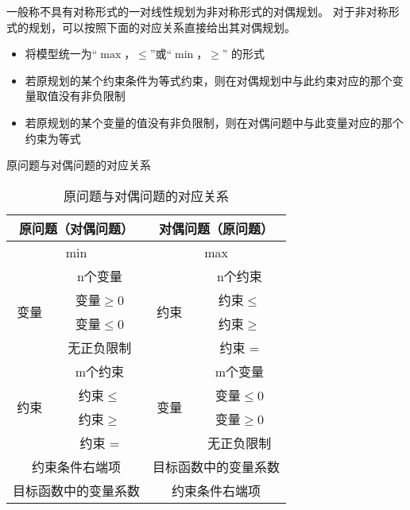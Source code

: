 \documentclass{book}
\begin{document}
\begin{enumerate}
          一般称不具有对称形式的一对线性规划为非对称形式的对偶规划。
          对于非对称形式的规划，可以按照下面的对应关系直接给出其对偶规划。
          \begin{itemize}
              \item 将模型统一为“$\max，\le$”或“$\min，\ge$” 的形式
              \item 若原规划的某个约束条件为等式约束，则在对偶规划中与此约束对应的那个变量取值没有非负限制
              \item 若原规划的某个变量的值没有非负限制，则在对偶问题中与此变量对应的那个约束为等式
          \end{itemize}
\end{enumerate}

原问题与对偶问题的对应关系

\begin{table}[ht]
    \centering
    \begin{tabular}{cc|cc}
        \hline
        \multicolumn{2}{c|}{原问题（对偶问题）}  & \multicolumn{2}{c}{对偶问题（原问题）}                                   \\
        \hline
        \multicolumn{2}{c|}{min}        & \multicolumn{2}{c}{max}                                         \\
        \hline
        \multirow{4}{*}{变量}             & n个变量                           & \multirow{4}{*}{约束} & n个约束     \\
                                        & 变量$\ge$0                       &                     & 约束$\le$  \\
                                        & 变量$\le$0                       &                     & 约束$\ge$  \\
                                        & 无正负限制                          &                     & 约束 =     \\
        \hline
        \multirow{4}{*}{约束}             & m个约束                           & \multirow{4}{*}{变量} & m个变量     \\
                                        & 约束$\le$                        &                     & 变量$\le$0 \\
                                        & 约束$\ge$                        &                     & 变量$\ge$0 \\
                                        & 约束 =                           &                     & 无正负限制    \\
        \hline
        \multicolumn{2}{c|}{约束条件右端项}    & \multicolumn{2}{c}{目标函数中的变量系数}                                  \\
        \multicolumn{2}{c|}{目标函数中的变量系数} & \multicolumn{2}{c}{约束条件右端项}                                     \\
        \hline
    \end{tabular}
    \caption{原问题与对偶问题的对应关系}
    \label{tab:corresponding relationship between problem
        P and the problem D}
\end{table}
\end{document}
